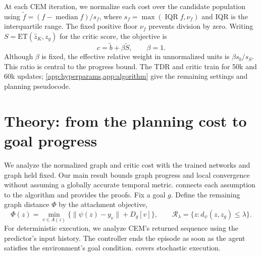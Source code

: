 \documentclass{article} %
\newcommand{\ET}{\mathrm{ET}}
\newcommand{\dd}{d_{\psi}}
\newcommand{\Rset}{\mathcal R_\lambda}
\theoremstyle{definition}
\theoremstyle{remark}
\begin{document}
At each CEM iteration, we normalize each cost over the candidate population using
$\widetilde f=(f-\operatorname{median}f)/s_f$, where
$s_f=\max(\operatorname{IQR}f,\nu_f)$ and IQR is the interquartile range. The fixed positive
floor $\nu_f$ prevents division by zero. Writing $S=\ET(\hat z_K,z_g)$ for the critic score,
the objective is
\begin{equation}
 c=\widetilde b+\beta\widetilde S,\qquad \beta=1.
 \label{eq:compose}
\end{equation}
Although $\beta$ is fixed, the effective relative weight in unnormalized units is
$\beta s_b/s_S$. This ratio is central to the progress bound.
The TDR and critic train for 50k and 60k updates; \cref{app:hyperparams,app:algorithm}
give the remaining settings and planning pseudocode.

\section{Theory: from the planning cost to goal progress}
\label{sec:theory}
We analyze the normalized graph and critic cost with the trained networks and graph
held fixed. Our main result bounds graph progress and local convergence without
assuming a globally accurate temporal metric.  connects each assumption
to the algorithm and provides the proofs.
Fix a goal $g$. Define the remaining graph distance $\Phi$ by the attachment objective,
\begin{equation}
 \Phi(z)=\min_{v\in A(z)}\{\|\psi(z)-y_v\|+D_g[v]\},
 \qquad \Rset=\{z:\dd(z,z_g)\le\lambda\}.
 \label{eq:potential}
\end{equation}
For deterministic execution, we analyze CEM's returned sequence using the predictor's input history.
The controller ends the episode as soon as the agent satisfies the environment's goal condition.
 covers stochastic execution.
\end{document}
